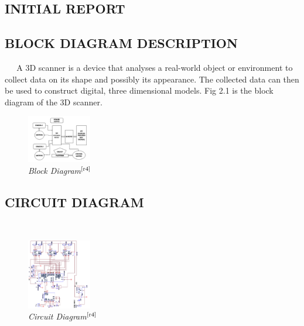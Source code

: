 \documentclass[12pt,a4paper,oneside]{report}
\begin{document}
\maketitle
\thispagestyle{empty}




\begin{onehalfspacing}


\chapter{\uppercase{INITIAL REPORT}}




\section{BLOCK DIAGRAM DESCRIPTION}



{$\;\;\;\;$}
A 3D scanner is a device that analyses a real-world object or environment to collect data on its shape and possibly its appearance. The collected data can then be used to construct digital, three dimensional models. Fig 2.1 is the block diagram of the 3D scanner.

\begin{figure}[htb]
\begin{center}
\leavevmode
\includegraphics[width=0.25\textwidth]{fig01.png}
\end{center}
\caption[Block Diagram]{\emph{Block Diagram}$^{ \scriptsize {\cite{r4}}}$}
\label{fig1}
\end{figure}

\section{CIRCUIT DIAGRAM}
{$\;\;\;\;$}

\begin{figure}[htb]
\begin{center}
\leavevmode
\includegraphics[width=0.25\textwidth]{fig02.png}
\end{center}
\caption[Circuit Diagram]{\emph{Circuit Diagram}$^{ \scriptsize {\cite{r4}}}$}
\label{fig1}
\end{figure}




\end{onehalfspacing}
\end{document}
